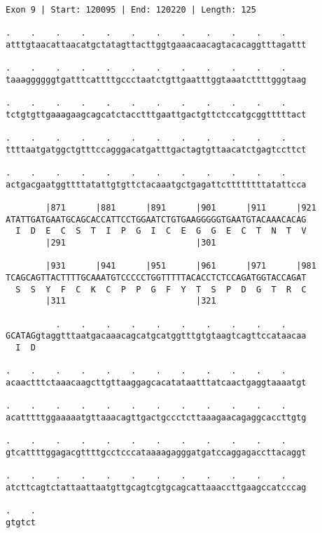 \documentclass{article}
\begin{document}
\begin{Verbatim}
Exon 9 | Start: 120095 | End: 120220 | Length: 125
 
.    .    .    .    .    .    .    .    .    .    .    .    
atttgtaacattaacatgctatagttacttggtgaaacaacagtacacaggtttagattt
  
.    .    .    .    .    .    .    .    .    .    .    .    
taaaggggggtgatttcattttgccctaatctgttgaatttggtaaatcttttgggtaag
  
.    .    .    .    .    .    .    .    .    .    .    .    
tctgtgttgaaagaagcagcatctacctttgaattgactgttctccatgcggtttttact
  
.    .    .    .    .    .    .    .    .    .    .    .    
ttttaatgatggctgtttccagggacatgatttgactagtgttaacatctgagtccttct
  
.    .    .    .    .    .    .    .    .    .    .    .    
actgacgaatggttttatattgtgttctacaaatgctgagattcttttttttatattcca
  
        |871      |881      |891      |901      |911      |921
ATATTGATGAATGCAGCACCATTCCTGGAATCTGTGAAGGGGGTGAATGTACAAACACAG
  I  D  E  C  S  T  I  P  G  I  C  E  G  G  E  C  T  N  T  V
        |291                          |301                  
  
        |931      |941      |951      |961      |971      |981
TCAGCAGTTACTTTTGCAAATGTCCCCCTGGTTTTTACACCTCTCCAGATGGTACCAGAT
  S  S  Y  F  C  K  C  P  P  G  F  Y  T  S  P  D  G  T  R  C
        |311                          |321                  
  
          .    .    .    .    .    .    .    .    .    .    
GCATAGgtaggtttaatgacaaacagcatgcatggtttgtgtaagtcagttccataacaa
  I  D                                                      
  
.    .    .    .    .    .    .    .    .    .    .    .    
acaactttctaaacaagcttgttaaggagcacatataatttatcaactgaggtaaaatgt
  
.    .    .    .    .    .    .    .    .    .    .    .    
acatttttggaaaaatgttaaacagttgactgccctcttaaagaacagaggcaccttgtg
  
.    .    .    .    .    .    .    .    .    .    .    .    
gtcattttggagacgttttgcctcccataaaagagggatgatccaggagaccttacaggt
  
.    .    .    .    .    .    .    .    .    .    .    .    
atcttcagtctattaattaatgttgcagtcgtgcagcattaaaccttgaagccatcccag
  
.    .
gtgtct
\end{Verbatim}
\newpage
\end{document}
